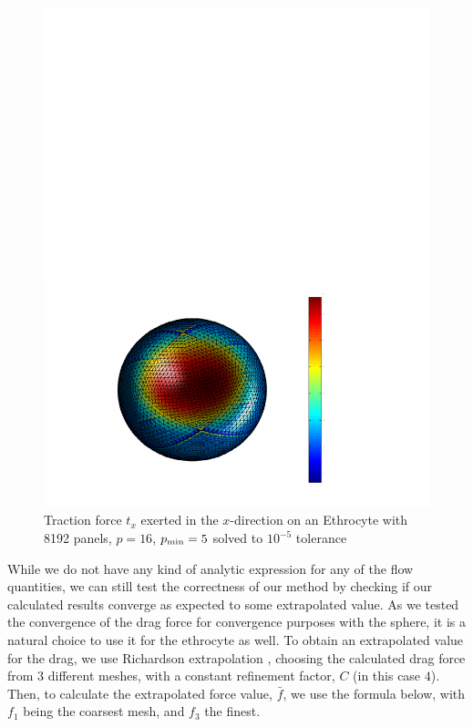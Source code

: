\begin{figure}[h]
\begin{center}
	\includegraphics[width=14cm]{img/RBCTraction2.pdf}
	\caption{Traction force $t_x$ exerted in the $x$-direction on an Ethrocyte with 8192 panels, $p=16$, $p_{\text{min}}=5$ solved to $10^{-5}$ tolerance}
	\label{fig:stokes_rbc_traction}
\end{center}
\end{figure}

While we do not have any kind of analytic expression for any of the flow quantities, we can still test the correctness of our method by checking if our calculated results converge as expected to some extrapolated value. As we tested the convergence of the drag force for convergence purposes with the sphere, it is a natural choice to use it for the ethrocyte as well. To obtain an extrapolated value for the drag, we use Richardson extrapolation \cite{roache1998}, choosing the calculated drag force from $3$ different meshes, with a constant refinement factor, $C$ (in this case $4$). Then, to calculate the extrapolated force value, $\bar{f}$, we  use the formula below, with $f_1$ being the coarsest mesh, and $f_3$ the finest.

